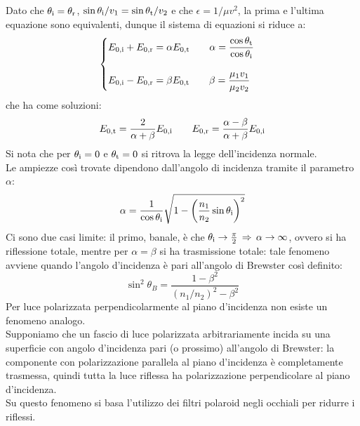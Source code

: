 \documentclass[]{article}
\begin{document}
Dato che $ \theta_{\text{i}} = \theta_{\text{r}} $, $ \sin\theta_{\text{i}} / v_1 = \sin\theta_{\text{t}} / v_2 $ e che $ \epsilon = 1 / \mu v^2 $, la prima e l'ultima equazione sono equivalenti, dunque il sistema di equazioni si riduce a: 
\begin{equation}
	\begin{cases}
		E_{0,\text{i}} + E_{0,\text{r}} = \alpha E_{0,\text{t}} \qquad \alpha = \displaystyle\frac{\cos\theta_{\text{t}}}{\cos\theta_{\text{i}}} \\ 
		\\ 
		E_{0,\text{i}} - E_{0,\text{r}} = \beta E_{0,\text{t}} \qquad \beta = \displaystyle\frac{\mu_1 v_1}{\mu_2 v_2} \\ 
	\end{cases}
	\label{eq:67}
\end{equation}
che ha come soluzioni:
\begin{equation}
	E_{0,\text{t}} = \frac{2}{\alpha + \beta} E_{0,\text{i}} \qquad E_{0,\text{r}} = \frac{\alpha - \beta}{\alpha + \beta} E_{0,\text{i}}
	\label{eq:68}
\end{equation}
Si nota che per $ \theta_{\text{i}} = 0 $ e $ \theta_{\text{t}} = 0 $ si ritrova la legge dell'incidenza normale. \\ 
Le ampiezze così trovate dipendono dall'angolo di incidenza tramite il parametro $ \alpha $:
\begin{equation}
	\alpha = \frac{1}{\cos\theta_{\text{i}}} \sqrt{1 - \left(\frac{n_1}{n_2} \sin\theta_{\text{i}}\right)^2}
	\label{eq:69}
\end{equation}
Ci sono due casi limite: il primo, banale, è che $ \theta_{\text{i}} \rightarrow \frac{\pi}{2} \,\Rightarrow\, \alpha \rightarrow \infty $, ovvero si ha riflessione totale, mentre per $ \alpha = \beta $ si ha trasmissione totale: tale fenomeno avviene quando l'angolo d'incidenza è pari all'angolo di Brewster così definito:
\begin{equation}
	\sin^2 \theta_B = \frac{1 - \beta^2}{(n_1 / n_2)^2 - \beta^2}
	\label{eq:70}
\end{equation}
Per luce polarizzata perpendicolarmente al piano d'incidenza non esiste un fenomeno analogo. \\ 
Supponiamo che un fascio di luce polarizzata arbitrariamente incida su una superficie con angolo d'incidenza pari (o prossimo) all'angolo di Brewster: la componente con polarizzazione parallela al piano d'incidenza è completamente trasmessa, quindi tutta la luce riflessa ha polarizzazione perpendicolare al piano d'incidenza. \\ 
Su questo fenomeno si basa l'utilizzo dei filtri polaroid negli occhiali per ridurre i riflessi.
\end{document}
